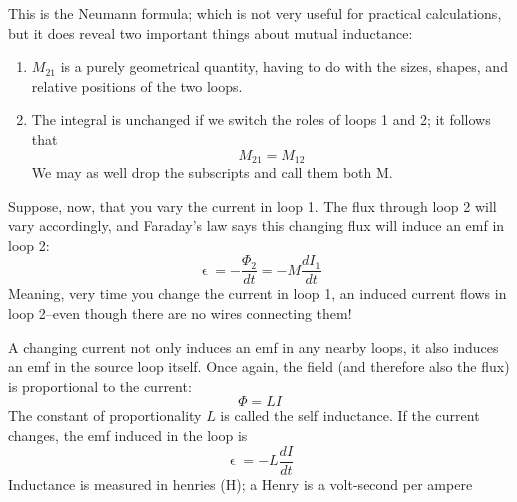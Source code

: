 \documentclass[../../../main.tex]{subfiles}
\begin{document}
This is the Neumann formula; which is not very useful for practical calculations, but it does reveal two important things about mutual inductance:
\begin{enumerate}
    \item $M_21$ is a purely geometrical quantity, having to do with the sizes, shapes,
    and relative positions of the two loops.
    \item The integral  is unchanged if we switch the roles of loops 1 and 2; it follows that\begin{equation*}
        M_{21} = M_{12}
    \end{equation*} We may as well drop the subscripts and call them both M.
\end{enumerate} 
Suppose, now, that you vary the current in loop 1. The ﬂux through loop 2 will vary accordingly, and Faraday’s law says this changing ﬂux will induce an emf in loop 2:
\begin{equation*}
    \upvarepsilon=-\frac{\Phi_2}{dt}=-M\frac{dI_1}{dt}
\end{equation*}
Meaning, very time you change the current in loop 1, an induced current ﬂows in loop 2--even though there are no wires connecting them! 

A changing current not only induces an emf in any nearby loops, it also induces an emf in the source loop itself. Once again, the ﬁeld (and therefore also the ﬂux) is proportional to the current:
\begin{equation*}
    \Phi=LI
\end{equation*}
The constant of proportionality $L$ is called the self inductance. If the current changes, the emf induced in the loop is
\begin{equation*}
    \upvarepsilon= -L\frac{dI}{dt}
\end{equation*}
Inductance is measured in henries (H); a Henry is a volt-second per ampere
\end{document}
